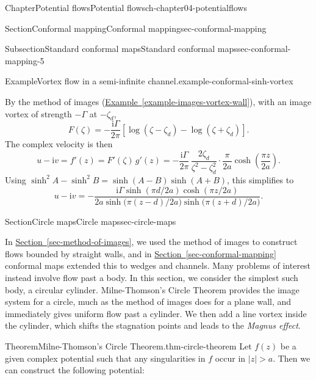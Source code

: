 \documentclass[oneside,10pt,]{book}
\newcommand{\xreffont}{\relax}
\numberwithin{equation}{section}
\newcommand{\im}{\mathrm{i}}
\begin{document}
\begin{chapterptx}{Chapter}{Potential flows}{}{Potential flows}{}{}{ch-chapter04-potentialflows}
\begin{sectionptx}{Section}{Conformal mapping}{}{Conformal mapping}{}{}{sec-conformal-mapping}
\begin{subsectionptx}{Subsection}{Standard conformal maps}{}{Standard conformal maps}{}{}{sec-conformal-mapping-5}
\begin{example}{Example}{Vortex flow in a semi-infinite channel.}{example-conformal-sinh-vortex}
\par
By the method of images (\hyperref[example-images-vortex-wall]{Example~{\xreffont\ref{example-images-vortex-wall}}}), with an image vortex of strength \(-\Gamma\) at \(-\zeta_d\),%
\begin{equation*}
F(\zeta) = -\frac{\im\Gamma}{2\pi}\left[\log(\zeta - \zeta_d) - \log(\zeta + \zeta_d)\right].
\end{equation*}
The complex velocity is then%
\begin{equation*}
u - \im v = f'(z) = F'(\zeta)\, g'(z) = -\frac{\im\Gamma}{2\pi}\,\frac{2\zeta_d}{\zeta^2 - \zeta_d^2}\cdot\frac{\pi}{2a}\cosh\left(\frac{\pi z}{2a}\right).
\end{equation*}
Using \(\sinh^2 A - \sinh^2 B = \sinh(A - B)\sinh(A + B)\), this simplifies to%
\begin{equation*}
u - \im v = -\frac{\im\Gamma \sinh(\pi d/2a) \cosh(\pi z/2a)}{2a \sinh\big(\pi(z - d)/2a\big) \sinh\big(\pi(z + d)/2a\big)}.
\end{equation*}
%
\end{example}
\end{subsectionptx}
\end{sectionptx}
%
%
\typeout{************************************************}
\typeout{************************************************}
%
\begin{sectionptx}{Section}{Circle maps}{}{Circle maps}{}{}{sec-circle-maps}
\begin{introduction}{}%
In \hyperref[sec-method-of-images]{Section~{\xreffont\ref{sec-method-of-images}}}, we used the method of images to construct flows bounded by straight walls, and in \hyperref[sec-conformal-mapping]{Section~{\xreffont\ref{sec-conformal-mapping}}} conformal maps extended this to wedges and channels. Many problems of interest instead involve flow past a body. In this section, we consider the simplest such body, a circular cylinder. Milne-Thomson's Circle Theorem provides the image system for a circle, much as the method of images does for a plane wall, and immediately gives uniform flow past a cylinder. We then add a line vortex inside the cylinder, which shifts the stagnation points and leads to the \emph{Magnus effect}.%
\end{introduction}%
\begin{theorem}{Theorem}{Milne-Thomson's Circle Theorem.}{}{thm-circle-theorem}%
Let \(f(z)\) be a given complex potential such that any singularities in \(f\) occur in \(|z| > a\). Then we can construct the following potential:%

\end{theorem}
\end{sectionptx}
\end{chapterptx}
\end{document}
